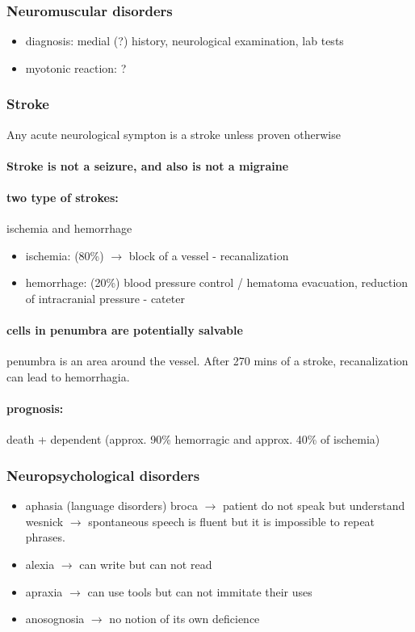 \documentclass[12pt,article,oneside,a4paper]{memoir}
\begin{document}
\subsubsection{Neuromuscular disorders}
\begin{itemize}
\item diagnosis: medial (?) history, neurological examination, lab tests
\item myotonic reaction: ?
\end{itemize}

\subsubsection{Stroke} 
Any acute neurological sympton is a stroke unless proven otherwise
\paragraph{Stroke is not a seizure, and also is not a migraine}
\paragraph{two type of strokes:} ischemia and hemorrhage
\begin{itemize}
\item ischemia: (80\%) $\rightarrow$ block of a vessel - recanalization
\item hemorrhage: (20\%) blood pressure control / hematoma evacuation, reduction of intracranial pressure - cateter
\end{itemize}
\paragraph{cells in penumbra are potentially salvable} penumbra is an area around the vessel.
After 270 mins of a stroke, recanalization can lead to  hemorrhagia.
\paragraph{prognosis:} death + dependent (approx. 90\% hemorragic and approx. 40\% of ischemia)

\subsubsection{Neuropsychological disorders }
\begin{itemize}
\item aphasia (language disorders)
\subitem broca $\rightarrow$ patient do not speak but understand
\subitem wesnick $\rightarrow$ spontaneous speech is fluent but it is impossible to repeat phrases.
\item alexia $\rightarrow$ can write but can not read
\item apraxia $\rightarrow$ can use tools but can not immitate their uses
\item anosognosia $\rightarrow$ no notion of its own deficience
\end{itemize}
\end{document}
